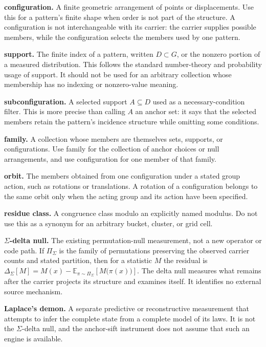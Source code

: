 \textbf{configuration.} A finite geometric arrangement of points or displacements. Use this for a pattern's finite shape when order is not part of the structure. A configuration is not interchangeable with its carrier: the carrier supplies possible members, while the configuration selects the members used by one pattern.

\textbf{support.} The finite index of a pattern, written \(D \subset G\), or the nonzero portion of a measured distribution. This follows the standard number-theory and probability usage of support. It should not be used for an arbitrary collection whose membership has no indexing or nonzero-value meaning.

\textbf{subconfiguration.} A selected support \(A \subseteq D\) used as a necessary-condition filter. This is more precise than calling \(A\) an anchor set: it says that the selected members retain the pattern's incidence structure while omitting some conditions.

\textbf{family.} A collection whose members are themselves sets, supports, or configurations. Use family for the collection of anchor choices or null arrangements, and use configuration for one member of that family.

\textbf{orbit.} The members obtained from one configuration under a stated group action, such as rotations or translations. A rotation of a configuration belongs to the same orbit only when the acting group and its action have been specified.

\textbf{residue class.} A congruence class modulo an explicitly named modulus. Do not use this as a synonym for an arbitrary bucket, cluster, or grid cell.

\textbf{\(\Sigma\)-delta null.} The existing permutation-null measurement, not a new operator or code path. If \(\Pi_\Sigma\) is the family of permutations preserving the observed carrier counts and stated partition, then for a statistic \(M\) the residual is \(\Delta_\Sigma[M] = M(x) - \mathbb{E}_{\pi \sim \Pi_\Sigma}\!\left[M\bigl(\pi(x)\bigr)\right].\) The delta null measures what remains after the carrier projects its structure and examines itself. It identifies no external source mechanism.

\textbf{Laplace's demon.} A separate predictive or reconstructive measurement that attempts to infer the complete state from a complete model of its laws. It is not the \(\Sigma\)-delta null, and the anchor-sift instrument does not assume that such an engine is available.

